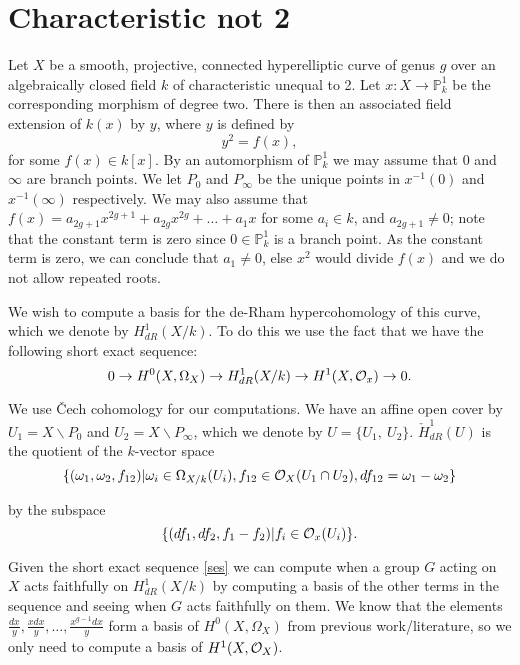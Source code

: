 \documentclass[draft, 11pt]{article} %
\title{}
\author{}
\theoremstyle{plain}
\theoremstyle{remark}
\newcommand{\cO}{{\cal O}}
\newcommand{\ra}{\rightarrow}
\begin{document}
\maketitle

\section{Characteristic not 2}


Let $X$ be a smooth, projective, connected hyperelliptic curve of genus $g$ over an algebraically closed field $k$ of characteristic unequal to 2.
Let $x:X\rightarrow \mathbb P_k^1$ be the corresponding morphism of degree two.
There is then an associated field extension of $k(x)$ by $y$, where $y$ is defined by
\[
y^2 = f(x),
\]
for some $f(x)\in k[x]$.
By an automorphism of $\mathbb P_k^1$ we may assume that $0$ and $\infty$ are branch points.
We let $P_0$ and $P_\infty$ be the unique points in $x^{-1}(0)$ and $x^{-1}(\infty)$ respectively.
We may also assume that $f(x) = a_{2g+1}x^{2g+1} + a_{2g}x^{2g} + \ldots + a_1x$ for some $a_i \in k$, and $a_{2g+1} \neq 0$; note that the constant term is zero since $0\in \mathbb P_k^1$ is a branch point.
As the constant term is zero, we can conclude that $a_1 \neq 0$, else $x^2$ would divide $f(x)$ and we do not allow repeated roots.

We wish to compute a basis for the de-Rham hypercohomology of this curve, which we denote by $H^1_{dR}(X/k)$. 
To do this we use the fact that we have the following short exact sequence:
\begin{equation}\label{ses}
0 \ra H^0(X,\Omega_X) \ra H^1_{dR}(X/k) \ra H^1(X,\cO_x) \ra 0.
\end{equation}

We use \v{C}ech cohomology for our computations.
We have an affine open cover by $U_1 = X\backslash P_0$ and $U_2 = X \backslash P_\infty$, which we denote by $U = \{ U_1, \ U_2\}$.
  $\check{H}_{dR}^1(U)$ is the quotient of the $k$-vector space 
\[
\{(\omega_1, \omega_2, f_{12}) | \omega_i\in \Omega_{X/k}(U_i), f_{12}\in \cO_X(U_1 \cap U_2), df_{12} = \omega_1 - \omega_2\}
\]

by the subspace
\[
\{ (df_1, df_2, f_1-f_2)|f_i \in \cO_x(U_i)\}.
\]

Given the short exact sequence \eqref{ses} we can compute when a group $G$ acting on $X$ acts faithfully on $H^1_{dR}(X/k)$ by computing a basis of the other terms in the sequence and seeing when $G$ acts faithfully on them.
We know that the elements $\frac{dx}{y}, \frac{xdx}{y}, \ldots , \frac{x^{g-1}dx}{y}$ form a basis of $H^0(X,\Omega_X)$ from previous work/literature, so we only need to compute a basis of $H^1(X,\cO_X)$.
\end{document}
